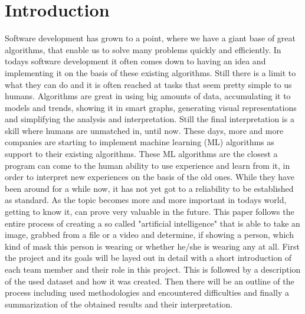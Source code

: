 \section{Introduction}

Software development has grown to a point, where we have a giant base of great
algorithms, that enable us to solve many problems quickly and efficiently. In
todays software development it often comes down to having an idea and
implementing it on the basis of these existing algorithms. Still there is a
limit to what they can do and it is often reached at tasks that seem pretty
simple to us humans. Algorithms are great in using big amounts of data,
accumulating it to models and trends, showing it in smart graphs, generating
visual representations and simplifying the analysis and interpretation. Still
the final interpretation is a skill where humans are unmatched in, until now.
\newline
These days, more and more companies are starting to implement machine learning
(ML) algorithms as support to their existing algorithms. These ML algorithms are
the closest a program can come to the human ability to use experience and learn
from it, in order to interpret new experiences on the basis of the old ones.
While they have been around for a while now, it has not yet got to a reliability
to be established as standard. As the topic becomes more and more important in
todays world, getting to know it, can prove very valuable in the future.
\newline
This paper follows the entire process of creating a so called "artificial
intelligence" that is able to take an image, grabbed from a file or a video and
determine, if showing a person, which kind of mask this person is wearing or
whether he/she is wearing any at all. First the project and its goals will be
layed out in detail with a short introduction of each team member and their role
in this project. This is followed by a description of the used dataset and how
it was created. Then there will be an outline of the process including used
methodologies and encountered difficulties and finally a summarization of the
obtained results and their interpretation. 